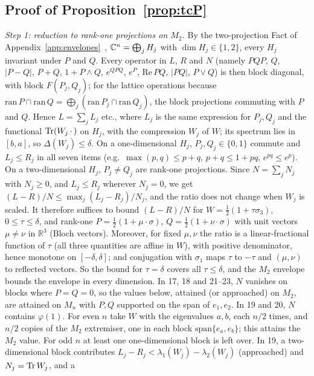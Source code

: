 \subsection*{Proof of Proposition~\ref{prop:tcP}}

\emph{Step 1: reduction to rank-one projections on $M_2$.} By the two-projection Fact of Appendix~\ref{app:envelopes}~\cite{halmos1969},
$\mathbb{C}^n=\bigoplus_jH_j$ with $\dim H_j\in\{1,2\}$, every $H_j$ invariant under $P$ and $Q$. Every operator in $L$, $R$
and $N$ (namely $PQP$, $Q$, $|P-Q|$, $P+Q$, $1+P\wedge Q$, $e^{QPQ}$, $e^P$, $\mathrm{Re}\,PQ$, $|PQ|$, $P\vee Q$)
is then block diagonal, with block $F(P_j,Q_j)$; for the lattice operations because $\mathrm{ran}\,P\cap\mathrm{ran}\,Q
=\bigoplus_j(\mathrm{ran}\,P_j\cap\mathrm{ran}\,Q_j)$, the block projections commuting with $P$ and $Q$. Hence
$L=\sum_jL_j$ etc., where $L_j$ is the same expression for $P_j,Q_j$ and the functional $\operatorname{Tr}(W_j\,\cdot\,)$ on
$H_j$, with the compression $W_j$ of $W$; its spectrum lies in $[b,a]$, so $\Delta(W_j)\le\delta$. On a
one-dimensional $H_j$, $P_j,Q_j\in\{0,1\}$ commute and $L_j\le R_j$ in all seven items (e.g.\ $\max(p,q)\le p+q$,
$p+q\le1+pq$, $e^{pq}\le e^p$). On a two-dimensional $H_j$, $P_j\ne Q_j$ are rank-one projections. Since $N=\sum_jN_j$
with $N_j\ge0$, and $L_j\le R_j$ wherever $N_j=0$, we get $(L-R)/N\le\max_j(L_j-R_j)/N_j$, and the ratio does not
change when $W_j$ is scaled. It therefore suffices to bound $(L-R)/N$ for $W=\frac12(1+\tau\sigma_3)$, $0\le\tau\le\delta$,
and rank-one $P=\frac12(1+\mu\cdot\sigma)$, $Q=\frac12(1+\nu\cdot\sigma)$ with unit vectors $\mu\ne\nu$ in $\mathbb R^3$
(Bloch vectors). Moreover, for fixed $\mu,\nu$ the ratio is a linear-fractional function of $\tau$ (all three
quantities are affine in $W$), with positive denominator, hence monotone on $[-\delta,\delta]$; and conjugation
with $\sigma_1$ maps $\tau$ to $-\tau$ and $(\mu,\nu)$ to reflected vectors. So the bound for $\tau=\delta$ covers all
$\tau\le\delta$, and the $M_2$ envelope bounds the envelope in every dimension. In 17, 18 and 21--23, $N$ vanishes
on blocks where $P=Q=0$, so the values below, attained (or approached) on $M_2$, are attained on $M_n$ with $P,Q$
supported on the span of $e_1,e_2$. In 19 and 20, $N$ contains $\varphi(1)$. For even $n$ take $W$ with the
eigenvalues $a,b$, each $n/2$ times, and $n/2$ copies of the $M_2$ extremiser, one in each block $\mathrm{span}
\{e_a,e_b\}$; this attains the $M_2$ value. For odd $n$ at least one one-dimensional block is left over. In 19, a
two-dimensional block contributes $L_j-R_j<\lambda_1(W_j)-\lambda_2(W_j)$ (approached) and $N_j=\operatorname{Tr} W_j$, and a
